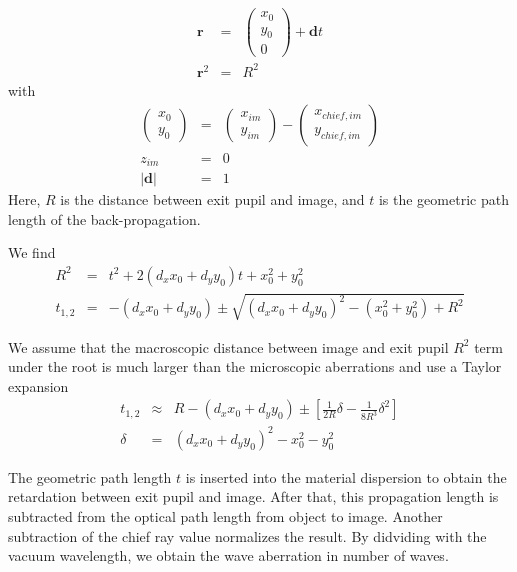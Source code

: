 \documentclass[12pt,a4paper,twoside,openright,BCOR10mm,headsepline,titlepage,abstracton,chapterprefix,final]{scrreprt}
\newcommand\Vector[1]{{\mathbf{#1}}}
\newcommand\Location{\Vector{r}}
\begin{document}
\begin{eqnarray}
 \Location &=& \begin{pmatrix} x_0 \\ y_0 \\ 0 \end{pmatrix} + \Vector{d} t \\
 \Location^2 &=& R^2
\end{eqnarray}
with
 \begin{eqnarray}
 \begin{pmatrix} x_0 \\ y_0 \end{pmatrix} &=& \begin{pmatrix} x_{im} \\ y_{im} \end{pmatrix} - \begin{pmatrix} x_{chief,im} \\ y_{chief,im} \end{pmatrix} \\
 z_{im} &=& 0 \\
 | \Vector{d} | &=& 1
\end{eqnarray}
Here, $R$ is the distance between exit pupil and image, and $t$ is the geometric path length of the back-propagation.

We find
\begin{eqnarray}
 R^2 &=&  t^2 + 2 (d_x x_0 + d_y y_0) t + x_0^2 + y_0^2 \\
 t_{1,2} &=& - (d_x x_0 + d_y y_0) \pm \sqrt{ (d_x x_0 + d_y y_0)^2 - (x_0^2 + y_0^2) + R^2 }
\end{eqnarray}

We assume that the macroscopic distance between image and exit pupil $R^2$ term under the root is much larger than the microscopic aberrations and use a Taylor expansion
\begin{eqnarray}
 t_{1,2} &\approx& R - (d_x x_0 + d_y y_0) \pm 
 \left[ 
   \frac{1}{2R} \delta - \frac{1}{8R^3} \delta^2
 \right]
 \\
 \delta &=& (d_x x_0 + d_y y_0)^2 - x_0^2 - y_0^2
\end{eqnarray}

The geometric path length $t$ is inserted into the material dispersion to obtain the retardation between exit pupil and image. After that, this propagation length is subtracted from the optical path length from object to image.
Another subtraction of the chief ray value normalizes the result.
By didviding with the vacuum wavelength, we obtain the wave aberration in number of waves.
\end{document}
